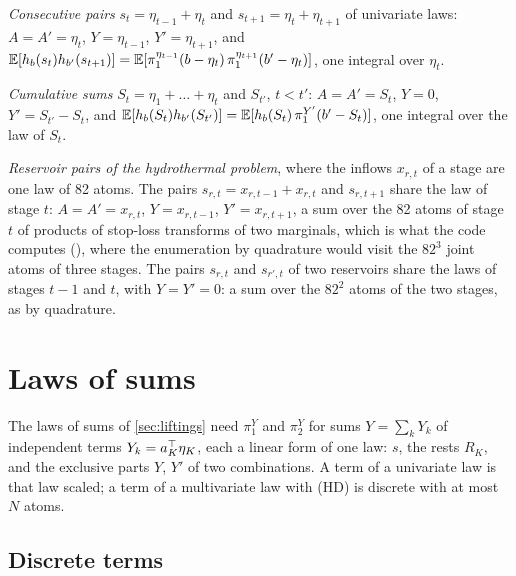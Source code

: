 \documentclass[11pt,a4paper]{article}
\numberwithin{equation}{section}
\newcommand{\hinge}[1]{h_{#1}}          %
\newcommand{\slt}[2]{\pi^{#1}_{#2}}      %
\newcommand{\Hyp}[1]{\textup{(H#1)}}    %
\begin{document}
\begin{example}
\label{ex:chains}
\emph{Consecutive pairs} $s_t = \eta_{t-1} + \eta_t$ and $s_{t+1} = \eta_t + \eta_{t+1}$ of univariate laws:
$A = A' = \eta_t$, $Y = \eta_{t-1}$, $Y' = \eta_{t+1}$, and
$\E[\hinge b(s_t)\hinge{b'}(s_{t+1})] = \E[\slt{\eta_{t-1}}1(b - \eta_t)\,\slt{\eta_{t+1}}1(b' - \eta_t)]$, one integral over $\eta_t$.

\emph{Cumulative sums} $S_t = \eta_1 + \dots + \eta_t$ and $S_{t'}$, $t < t'$:
$A = A' = S_t$, $Y = 0$, $Y' = S_{t'} - S_t$, and
$\E[\hinge b(S_t)\hinge{b'}(S_{t'})] = \E[\hinge b(S_t)\,\slt{Y'}1(b' - S_t)]$, one integral over the law of $S_t$.

\emph{Reservoir pairs of the hydrothermal problem}, where the inflows $x_{r,t}$ of a stage are one  law of 82 atoms.
The pairs $s_{r,t} = x_{r,t-1} + x_{r,t}$ and $s_{r,t+1}$ share the law of stage $t$:
$A = A' = x_{r,t}$, $Y = x_{r,t-1}$, $Y' = x_{r,t+1}$, a sum over the 82 atoms of stage $t$ of products of stop-loss transforms of two marginals,
which is what the code computes (),
where the enumeration by quadrature would visit the $82^3$ joint atoms of three stages.
The pairs $s_{r,t}$ and $s_{r',t}$ of two reservoirs share the laws of stages $t - 1$ and $t$, with $Y = Y' = 0$:
a sum over the $82^2$ atoms of the two stages, as by quadrature.
\end{example}

\section{Laws of sums}
\label{sec:sums}

The laws of sums of \cref{sec:liftings} need $\slt Y1$ and $\slt Y2$ for sums $Y = \sum_k Y_k$ of independent terms $Y_k = a_K^\top\eta_K$, each a linear form of one law:
$s$, the rests $R_K$, and the exclusive parts $Y$, $Y'$ of two combinations.
A term of a univariate law is that law scaled; a term of a multivariate law with \Hyp{D} is discrete with at most $N$ atoms.

\subsection{Discrete terms}
\label{sec:sums-discrete}
\end{document}
